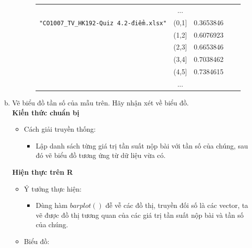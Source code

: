 \documentclass[a4paper]{article}
\theoremstyle{definition}
\begin{document}
\begin{enumerate}[a)]
\begin{itemize}
\begin{itemize}
\begin{center}
\begin{tabular}{l c c c c}
                     & ...\\
                     \texttt{"CO1007\_TV\_HK192-Quiz 4.2-điểm.xlsx"} & (0,1] & 0.3653846 \\ & (1,2] & 0.6076923 \\ & (2,3] & 0.6653846 \\ & (3,4] & 0.7038462 \\ & (4,5] & 0.7384615\\
                     & ...
                \end{tabular}
            \end{center}
        \end{itemize}
    \end{itemize}
    \bf\item Vẽ biểu đồ tần số của mẫu trên. Hãy nhận xét về biểu đồ.\\[6pt]
    \bf Kiến thức chuẩn bị\normalfont
    \begin{itemize}
        \item Cách giải truyền thống:
        \begin{itemize}
            \item Lập danh sách từng giá trị tần suất nộp bài với tần số của chúng, sau đó vẽ biểu đồ tương ứng từ dữ liệu vừa có.
        \end{itemize}
    \end{itemize}
    \bf Hiện thực trên R\normalfont
    \begin{itemize}
        \item Ý tưởng thực hiện:
        \begin{itemize}
            \item Dùng hàm $barplot()$ đễ vễ các đồ thị, truyền đối số là các vector, ta vẽ được đồ thị tương quan của các giá trị tần suất nộp bài và tần số của chúng.
        \end{itemize}
        \item Biểu đồ:\\
        \begin{center}
            \begin{tabular}{c c}

\end{tabular}
\end{center}
\end{itemize}
\end{enumerate}
\end{document}

